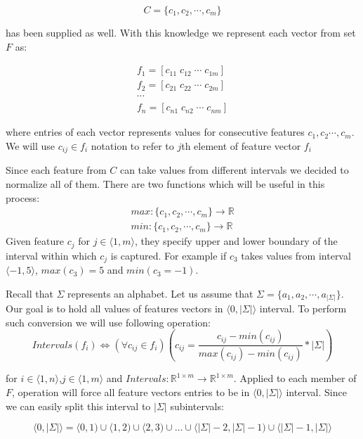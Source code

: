 \documentclass{mini}
\begin{document}
\[ C = \{ c_1 , c_2, \cdots , c_m \}\] 

has been supplied as well. With this knowledge we represent each vector from set $F$ as: 

\begin{align*}
f_1 = [ c_{11} \; c_{12} \; \cdots \; c_{1m}] \\
f_2 = [ c_{21} \; c_{22} \; \cdots \; c_{2m}] \\
\cdots \\
f_n = [ c_{n1} \; c_{n2} \; \cdots \; c_{nm}] 
\end{align*}

where entries of each vector represents values for consecutive features $c_1, c_2 \cdots , c_m$. We will use $c_{ij }\in f_i$ notation to refer to $j$th element of feature vector $f_i$ 

Since each feature from $C$ can take values from different intervals we decided to normalize all of them. There are two functions which will be useful in this process:
\begin{align*}
max : \{c_1, c_2, \cdots, c_m\} \rightarrow \mathbb{R} \\
min : \{c_1, c_2, \cdots, c_m\} \rightarrow \mathbb{R}
\end{align*}
Given feature $c_j$ for $j \in \langle 1, m \rangle$, they specify upper and lower boundary of the interval within which $c_j$ is captured. For example if $c_3$ takes values from interval $\langle -1 , 5 \rangle$, $max(c_3) = 5$ and $min(c_3 = -1)$.

Recall that $\Sigma$ represents an alphabet. Let us assume that $\Sigma = \{a_1 , a_2, \cdots, a_{|\Sigma|}\}$. Our goal is to hold all values of features vectors in $\langle 0 , |\Sigma| \rangle$ interval. To perform such conversion we will use following operation:
\begin{equation}
Intervals(f_i) \Leftrightarrow (\forall{c_{ij} \in f_i})(c_{ij} =  \frac{c_{ij} - min(c_{ij})}{max(c_{ij}) - min(c_{ij})} * |\Sigma|)
\end{equation}

for $i \in \langle 1, n \rangle$,$j \in \langle 1, m \rangle$ and $Intervals : \mathbb{R}^{1 \times m} \rightarrow \mathbb{R}^{1 \times m}$. Applied to each member of $F$, operation will force all feature vectors entries to be in $\langle 0 , |\Sigma| \rangle$ interval. Since we can easily split this interval to $|\Sigma|$ subintervals:

\[
\langle 0 , |\Sigma| \rangle = \langle 0 , 1) \cup \langle 1 , 2 ) \cup \langle 2 , 3 ) \cup \ldots \cup \langle |\Sigma| -2 , |\Sigma| -1 ) \cup \langle |\Sigma| -1, |\Sigma|  \rangle
\] 
\end{document}
